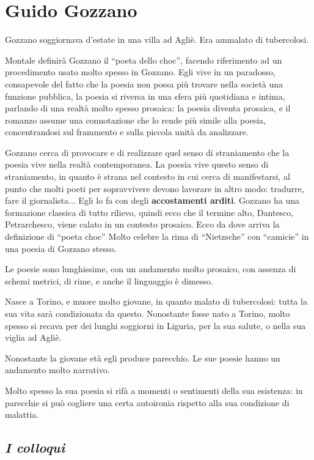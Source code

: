 \chapter{Guido Gozzano}

Gozzano soggiornava d’estate in una villa ad Agliè. Era ammalato di tubercolosi.

Montale definirà Gozzano il “poeta dello choc”, facendo riferimento ad un procedimento usato molto spesso in Gozzano. 
Egli vive in un paradosso, consapevole del fatto che la poesia non possa più trovare nella società una funzione pubblica, la poesia si riversa in una sfera più quotidiana e intima, parlando di una realtà molto spesso prosaica: la poesia diventa prosaica, e il romanzo assume una connotazione che lo rende più simile alla poesia, concentrandosi sul frammento e sulla piccola unità da analizzare.

Gozzano cerca di provocare e di realizzare quel senso di straniamento che la poesia vive nella realtà contemporanea. La poesia vive questo senso di straniamento, in quanto è strana nel contesto in cui cerca di manifestarsi, al punto che molti poeti per sopravvivere devono lavorare in altro modo: tradurre, fare il giornalista...
Egli lo fa con degli \textbf{accostamenti arditi}. Gozzano ha una formazione classica di tutto rilievo, quindi ecco che il termine alto, Dantesco, Petrarchesco, viene calato in un contesto prosaico. Ecco da dove arriva la definizione di “poeta choc”
Molto celebre la rima di “Nietzsche” con “camicie” in una poesia di Gozzano stesso.

Le poesie sono lunghissime, con un andamento molto prosaico, con assenza di schemi metrici, di rime, e anche il linguaggio è dimesso.

Nasce a Torino, e muore molto giovane, in quanto malato di tubercolosi: tutta la sua vita sarà condizionata da questo.
Nonostante fosse nato a Torino, molto spesso si recava per dei lunghi soggiorni in Liguria, per la sua salute, o nella sua viglia ad Agliè.

Nonostante la giovane età egli produce parecchio. Le sue poesie hanno un andamento molto narrativo.

Molto spesso la sua poesia si rifà a momenti o sentimenti della sua esistenza: in parecchie si può cogliere una certa autoironia rispetto alla sua condizione di malattia.

\section{\textit{I colloqui}}

